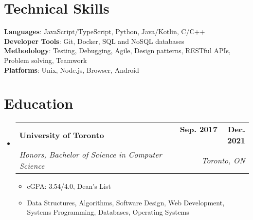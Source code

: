 \documentclass[letterpaper,11pt]{article}
\makeatletter
\newcommand{\resumeItem}[1]{
  \item\small{
    {#1 \vspace{-2pt}}
  }
}
\newcommand{\resumeSubheading}[4]{
  \vspace{-2pt}\item
    \begin{tabular*}{1.0\textwidth}[t]{l@{\extracolsep{\fill}}r}
      \textbf{#1} & \textbf{\small #2} \\
      \textit{\small#3} & \textit{\small #4} \\
    \end{tabular*}\vspace{-7pt}
}
\newcommand{\resumeSubHeadingListStart}{\begin{itemize}[leftmargin=0.0in, label={}]}
\newcommand{\resumeSubHeadingListEnd}{\end{itemize}}
\newcommand{\resumeItemListStart}{\begin{itemize}}
\newcommand{\resumeItemListEnd}{\end{itemize}\vspace{-5pt}}
\makeatother
\begin{document}
\section{Technical Skills}
\begin{itemize}[leftmargin=0.15in, label={}]
    \small{\item{
          \textbf{Languages}{: JavaScript/TypeScript, Python, Java/Kotlin, C/C++} \\
          \textbf{Developer Tools}{: Git, Docker, SQL and NoSQL databases} \\
          \textbf{Methodology}{: Testing, Debugging, Agile, Design patterns, RESTful APIs, Problem solving, Teamwork} \\
          \textbf{Platforms}{: Unix, Node.js, Browser, Android} \\
          }}
\end{itemize}

\section{Education}
\resumeSubHeadingListStart
\resumeSubheading
{University of Toronto}{Sep. 2017 -- Dec. 2021}
{Honors, Bachelor of Science in Computer Science}{Toronto, ON}
\resumeItemListStart
\resumeItem{cGPA: 3.54/4.0, Dean's List}
\resumeItem{Data Structures, Algorithms, Software Design, Web Development, Systems Programming, Databases, Operating Systems}
\resumeItemListEnd
\resumeSubHeadingListEnd

\vspace{-16pt}
\end{document}
